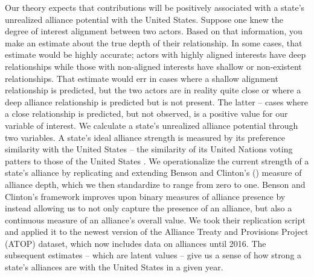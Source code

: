 \documentclass[12pt,letterpaper]{article}
\begin{document}
		Our theory expects that contributions will be positively associated with a state's unrealized alliance potential with the United States. Suppose one knew the degree of interest alignment between two actors. Based on that information, you make an estimate about the true depth of their relationship. In some cases, that estimate would be highly accurate; actors with highly aligned interests have deep relationships while those with non-aligned interests have shallow or non-existent relationships. That estimate would err in cases where a shallow alignment relationship is predicted, but the two actors are in reality quite close or where a deep alliance relationship is predicted but is not present. The latter -- cases where a close relationship is predicted, but not observed, is a positive value for our variable of interest. We calculate a state's unrealized alliance potential through two variables. A state's ideal alliance strength is measured by its preference similarity with the United States -- the similarity of its United Nations voting patters to those of the United States \citep{gartzke_preferencesdemocraticpeace_2000}. We operationalize the current strength of a state's alliance by replicating and extending Benson and Clinton's (\citeyear{benson_assessingvariationformal_2016}) measure of alliance depth, which we then standardize to range from zero to one. Benson and Clinton's framework improves upon binary measures of alliance presence by instead allowing us to not only capture the presence of an alliance, but also a continuous measure of an alliance's overall value. We took their replication script and applied it to the newest version of the Alliance Treaty and Provisions Project (ATOP) dataset, which now includes data on alliances until 2016. \citep{leeds_alliancetreatyobligations_2002} The subsequent estimates -- which are latent values -- give us a sense of how strong a state's alliances are with the United States in a given year.
\end{document}
